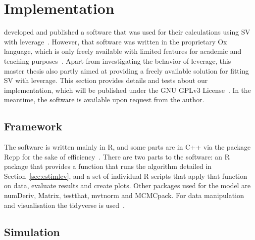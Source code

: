 \section{Implementation}

\citeauthor{Nakajima2009} developed and published a software that was used for their calculations using SV with leverage~\citep{nakajima2009code}.
However, that software was written in the proprietary Ox language, which is only freely available with limited features for academic and teaching purposes~\citep{doornik2009object}.
Apart from investigating the behavior of leverage, this master thesis also partly aimed at providing a freely available solution for fitting SV with leverage.
This section provides details and tests about our implementation, which will be published under the GNU GPLv3 License~\citep{gplv3}.
In the meantime, the software is available upon request from the author.

\subsection{Framework}

The software is written mainly in R, and some parts are in C++ via the package Rcpp for the sake of efficiency~\citep{rlanguage,rcpp2011,iso2016iec}.
There are two parts to the software: an R package that provides a function that runs the algorithm detailed in Section~\ref{sec:estimlev}, and a set of individual R scripts that apply that function on data, evaluate results and create plots.
Other packages used for the model are numDeriv, Matrix, testthat, mvtnorm and MCMCpack.
For data manipulation and visualisation the tidyverse is used~\citep{rmcmcpack,rtestthat,rmatrix,rnumderiv,rmvtnorm,rtidyverse}.

\subsection{Simulation}\label{sec:simulation}

